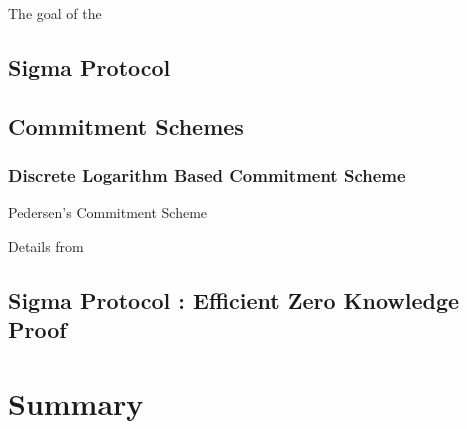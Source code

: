    The goal of the 
     
      
     \subsection{Sigma Protocol}
     
     \subsection{Commitment Schemes}   
        \subsubsection{Discrete Logarithm Based Commitment Scheme}
         Pedersen's Commitment Scheme
    
  		Details from 
  	 \subsection{Sigma Protocol : Efficient Zero Knowledge Proof}
  



\section{Summary}
